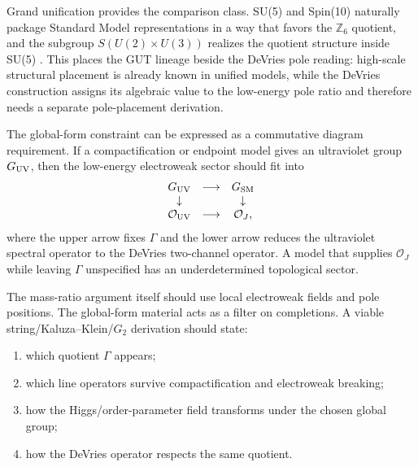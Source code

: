Grand unification provides the comparison class.  SU(5) and Spin(10) naturally package Standard Model representations in a way that favors the \(\mathbb Z_6\) quotient, and the subgroup \(S(U(2)\times U(3))\) realizes the quotient structure inside SU(5) \cite{BaezHuerta2010,Britto2021}.  This places the GUT lineage beside the DeVries pole reading: high-scale structural placement is already known in unified models, while the DeVries construction assigns its algebraic value to the low-energy pole ratio and therefore needs a separate pole-placement derivation.

The global-form constraint can be expressed as a commutative diagram requirement.  If a compactification or endpoint model gives an ultraviolet group \(G_{\rm UV}\), then the low-energy electroweak sector should fit into
\begin{equation}
\begin{array}{ccc}
G_{\rm UV} & \longrightarrow & G_{\rm SM} \\
\downarrow & & \downarrow \\
\mathcal O_{\rm UV} & \longrightarrow & \mathcal O_J ,
\end{array}
\label{eq:global-diagram}
\end{equation}
where the upper arrow fixes \(\Gamma\) and the lower arrow reduces the ultraviolet spectral operator to the DeVries two-channel operator.  A model that supplies \(\mathcal O_J\) while leaving \(\Gamma\) unspecified has an underdetermined topological sector.

The mass-ratio argument itself should use local electroweak fields and pole positions.  The global-form material acts as a filter on completions.  A viable string/Kaluza--Klein/\(G_2\) derivation should state:
\begin{enumerate}
\item which quotient \(\Gamma\) appears;
\item which line operators survive compactification and electroweak breaking;
\item how the Higgs/order-parameter field transforms under the chosen global group;
\item how the DeVries operator respects the same quotient.
\end{enumerate}
